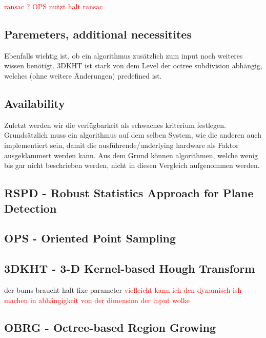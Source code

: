 \documentclass[main.tex]{subfiles}
\begin{document}
\textcolor{red}{ransac ? OPS nutzt halt ransac}

\subsection{Paremeters, additional necessitites}
Ebenfalls wichtig ist, ob ein algorithmus zusätzlich zum input noch weiteres wissen benötigt. 3DKHT ist stark von dem Level der
octree subdivision abhängig, welches (ohne weitere Änderungen) predefined ist.

\subsection*{Availability}
Zuletzt werden wir die verfügbarkeit als schwaches kriterium festlegen.
Grundsätzlich muss ein algorithmus auf dem selben System, wie die anderen auch implementiert sein, damit die ausführende/underlying hardware
als Faktor ausgeklammert werden kann. Aus dem Grund können algorithmen, welche wenig bis gar nicht beschrieben werden, nicht in diesen Vergleich
aufgenommen werden.

\subsection{RSPD - Robust Statistics Approach for Plane Detection}
\subsection{OPS - Oriented Point Sampling}
\subsection{3DKHT - 3-D Kernel-based Hough Transform}
der bums braucht halt fixe parameter 
\textcolor{red}{vielleicht kann ich den dynamisch-ish machen in abhängigkeit von der dimension der input wolke}
\subsection{OBRG - Octree-based Region Growing}
\end{document}
